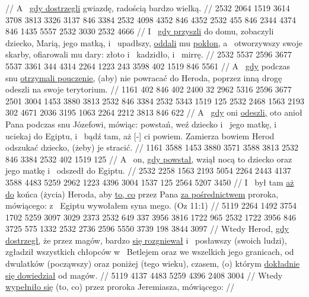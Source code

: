 //
\glb
{} A~ \underline{gdy dostrzegli} gwiazdę,  radością bardzo wielką.
//
\endgl
\begingl
\gla
{} 2532 2064 1519 3614 3708 3813 3326 3137 846 3384 2532 4098 4352 846 4352 2532 455 846 2344 4374 846 1435 5557 2532 3030 2532 4666
//
\glb
{} I~ \underline{gdy przyszli} do domu, zobaczyli dziecko,  Marią, jego matką, i~ upadłszy, \underline{oddali} mu \underline{pokłon,} a~ otworzywszy swoje skarby, ofiarowali mu dary: złoto i~ kadzidło, i~ mirrę.
//
\endgl
\begingl
\gla
{} 2532 5537 2596 3677 5537 {} 3361 344 4314 2264 1223 243 3598 402 1519 846 5561
//
\glb
{} A~ \underline{gdy} podczas snu \underline{otrzymali pouczenie,} (aby) nie powracać do Heroda, poprzez inną drogę odeszli na swoje terytorium.
//
\endgl
\begingl
\gla
{} 1161 402 846 402 2400 32 2962 5316 2596 3677 2501 3004 1453 3880 3813 2532 846 3384 2532 5343 1519 125 2532 2468 1563 2193 302 4671 2036 3195 1063 2264 2212 3813 {} 846 622
//
\glb
{} A~ \underline{gdy} oni \underline{odeszli,} oto anioł Pana  podczas snu Józefowi, mówiąc: powstań, weź dziecko i~ jego matkę, i~ uciekaj do Egiptu, i~ bądź tam, aż [-] ci powiem. Zamierza bowiem Herod odszukać dziecko, (żeby) je stracić.
//
\endgl
\begingl
\gla
{} 1161 3588 1453 3880 3571 3588 3813 2532 846 3384 2532 402 1519 125
//
\glb
{} A~ on, \underline{gdy powstał,} wziął nocą to dziecko oraz jego matkę i~ odszedł do Egiptu.
//
\endgl
\begingl
\gla
{} 2532 2258 1563 2193 5054 {} 2264 2443 4137 3588 4483 5259 2962 1223 4396 3004 1537 125 2564 5207 3450 {}
//
\glb
{} I~ był tam \underline{aż do} końca (życia) Heroda, aby  \underline{to, co}  przez Pana \underline{za pośrednictwem} proroka, mówiącego: z~ Egiptu wywołałem syna mego. (Oz 11:1)
//
\endgl
\begingl
\gla
{} 5119 2264 1492 3754 1702 5259 3097 3029 2373 2532 649 {} 337 3956 3816 1722 965 2532 1722 3956 846 3725 575 1332 {} 2532 2736 {} 2596 5550 {} 3739 198 3844 3097
//
\glb
{} Wtedy Herod, \underline{gdy dostrzegł,} że  przez magów, bardzo \underline{się rozgniewał} i~ posławszy (swoich ludzi), zgładził wszystkich chłopców w~ Betlejem oraz we wszelkich jego granicach, od dwulatków (począwszy) oraz poniżej (tego wieku),  czasem, (o) którym \underline{dokładnie się dowiedział} od magów.
//
\endgl
\begingl
\gla
{} 5119 4137 {} 4483 5259 4396 2408 3004
//
\glb
{} Wtedy \underline{wypełniło się} (to, co)  przez proroka Jeremiasza, mówiącego:
//
\endgl

